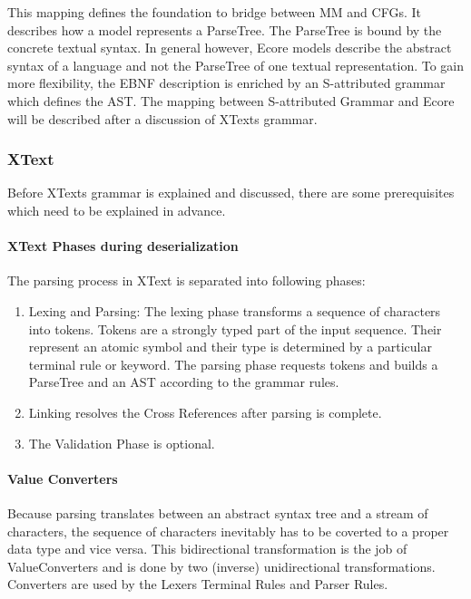 This mapping defines the foundation to bridge between MM and CFGs. It describes how a model represents a ParseTree. The ParseTree is bound by the concrete textual syntax. In general however, Ecore models describe the abstract syntax of a language and not the ParseTree of one textual representation. To gain more flexibility, the EBNF description is enriched by an S-attributed grammar which defines the AST. The mapping between S-attributed Grammar and Ecore will be described after a discussion of XTexts grammar.

\subsubsection{XText}
Before XTexts grammar is explained and discussed, there are some prerequisites which need to be explained in advance.

\paragraph{XText Phases during deserialization}
The parsing process in XText is separated into following phases:
\begin{enumerate}
	\item Lexing and Parsing: The lexing phase transforms a sequence of characters into tokens. Tokens are a strongly typed part of the input sequence. Their represent an atomic symbol and their type is determined by a particular terminal rule or keyword. The parsing phase requests tokens and builds a ParseTree and an AST according to the grammar rules.
	\item Linking resolves the Cross References after parsing is complete.
	\item The Validation Phase is optional.
\end{enumerate}

\paragraph{Value Converters}
Because parsing translates between an abstract syntax tree and a stream of characters, the sequence of characters inevitably has to be coverted to a proper data type and vice versa. This bidirectional transformation is the job of ValueConverters and is done by two (inverse) unidirectional transformations. Converters are used by the Lexers Terminal Rules and Parser Rules.


